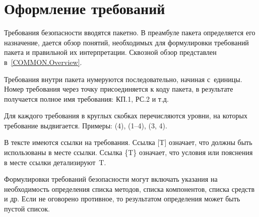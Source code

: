 \section{Оформление требований}\label{COMMON.Notation}

Требования безопасности вводятся пакетно. В преамбуле пакета определяется 
его назначение, дается обзор понятий, необходимых для формулировки 
требований пакета и правильной их интерпретации.
%
Сквозной обзор представлен в~\ref{COMMON.Overview}.

Требования внутри пакета нумеруются последовательно, начиная с~единицы.
%
Номер требования через точку присоединяется к коду пакета, 
в результате получается полное имя требования: КП.1, РС.2 и т.д.

Для каждого требования в круглых скобках перечисляются уровни, 
на которых требование выдвигается.
Примеры: (4), (1--4), (3, 4).

В тексте имеются ссылки на требования. Ссылка [T] означает, что 
 должны быть использованы в месте 
ссылки.
%
Ссылка \{T\} означает, что условия или пояснения в месте ссылки детализируют~T. 

Формулировки требований безопасности могут включать указания на 
необходимость определения списка методов, списка компонентов, 
списка средств и др.
%
Если не оговорено противное, то результатом определения 
может быть пустой список.
